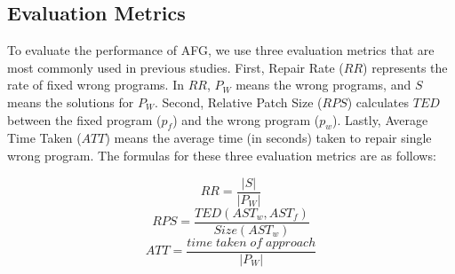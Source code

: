 \documentclass[10pt,conference]{IEEEtran}
\begin{document}
    \subsection{Evaluation Metrics}
        To evaluate the performance of AFG, we use three evaluation metrics that are most commonly used in previous studies. First, Repair Rate ($RR$) represents the rate of fixed wrong programs. In $RR$, $P_{W}$ means the wrong programs, and $S$ means the solutions for $P_{W}$. Second, Relative Patch Size ($RPS$) calculates $TED$ between the fixed program ($p_{f}$) and the wrong program ($p_{w}$). Lastly, Average Time Taken ($ATT$) means the average time (in seconds) taken to repair single wrong program. The formulas for these three evaluation metrics are as follows:

        \begin{equation}
            RR = \frac{|S|}{|P_{W}|} \nonumber
        \end{equation}
        \begin{equation}
            RPS = \frac{TED(AST_{w}, AST_{f})}{Size(AST_{w})} \nonumber
        \end{equation}
        \begin{equation}
            ATT = \frac{time\;taken\;of\;approach}{|P_{W}|} \nonumber
        \end{equation}
\end{document}
